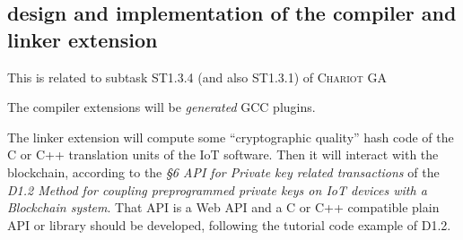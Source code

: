 \subsection{design and implementation of the compiler and linker extension}

\label{subsec:compilinkext}
This is related to subtask ST1.3.4 (and also ST1.3.1) of \textsc{Chariot} GA 

The compiler extensions will be \emph{generated} GCC plugins.

The linker extension will compute some ``cryptographic quality'' hash
code of the C or C++ translation units of the IoT software. Then it
will interact with the blockchain, according to the \emph{§6 API for
  Private key related transactions} of the \emph{D1.2 Method for
  coupling preprogrammed private keys on IoT devices with a Blockchain
  system}. That API is a Web API and a C or C++ compatible plain API
or library should be developed, following the tutorial code example of
D1.2.
